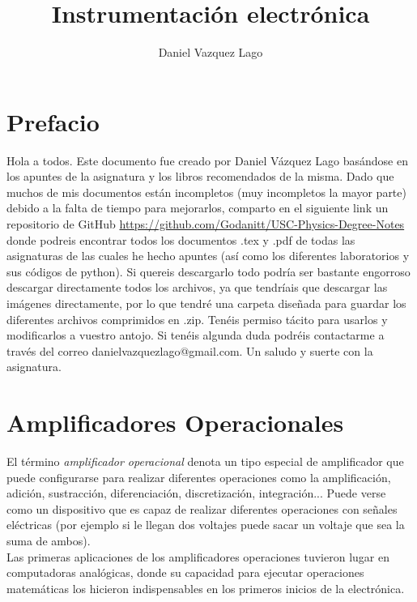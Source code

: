 \documentclass[11pt]{article} %
\author{Daniel Vazquez Lago}
\title{Instrumentación electrónica}
\begin{document}
\maketitle

\newpage

\tableofcontents

\newpage
\section*{Prefacio}

Hola a todos. Este documento fue creado por Daniel Vázquez Lago basándose en los apuntes de la asignatura y los libros recomendados de la misma. Dado que muchos de mis documentos están incompletos (muy incompletos la mayor parte) debido a la falta de tiempo para mejorarlos, comparto en el siguiente link un repositorio de GitHub \url{https://github.com/Godanitt/USC-Physics-Degree-Notes} donde podreis encontrar todos los documentos .tex y .pdf de todas las asignaturas de las cuales he hecho apuntes (así como los diferentes laboratorios y sus códigos de python). Si quereis descargarlo todo podría ser bastante engorroso descargar directamente todos los archivos, ya que tendríais que descargar las imágenes directamente, por lo que tendré una carpeta diseñada para guardar los diferentes archivos comprimidos en .zip. Tenéis permiso tácito para usarlos y modificarlos a vuestro antojo. Si tenéis algunda duda podréis contactarme a través del correo danielvazquezlago@gmail.com. Un saludo y suerte con la asignatura.

\newpage

\section{Amplificadores Operacionales}

El término \textit{amplificador operacional} denota un tipo especial de amplificador que puede configurarse para realizar diferentes operaciones como la amplificación, adición, sustracción, diferenciación, discretización, integración... Puede verse como un dispositivo que es capaz de realizar diferentes operaciones con señales eléctricas (por ejemplo si le llegan dos voltajes puede sacar un voltaje que sea la suma de ambos). \\

Las primeras aplicaciones de los amplificadores operaciones tuvieron lugar en computadoras analógicas, donde su capacidad para ejecutar operaciones matemáticas los hicieron indispensables en los primeros inicios de la electrónica. \\
 
\end{document}
